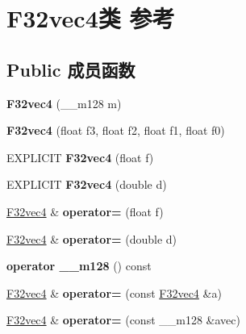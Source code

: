 \hypertarget{class_f32vec4}{}\section{F32vec4类 参考}
\label{class_f32vec4}
\subsection*{Public 成员函数}
\begin{DoxyCompactItemize}
\item 
\mbox{\label{class_f32vec4_a41c8e1640519befb7a0fc65224f541f9}} 
{\bfseries F32vec4} (\+\_\+\+\_\+m128 m)
\item 
\mbox{\label{class_f32vec4_aea420803e26904f3b1120c57877e8037}} 
{\bfseries F32vec4} (float f3, float f2, float f1, float f0)
\item 
\mbox{\label{class_f32vec4_ad18c5fd17f127656eec28b6106a0e340}} 
E\+X\+P\+L\+I\+C\+IT {\bfseries F32vec4} (float f)
\item 
\mbox{\label{class_f32vec4_a4bd213d5b8d043870dcf0263bd7b6059}} 
E\+X\+P\+L\+I\+C\+IT {\bfseries F32vec4} (double d)
\item 
\mbox{\label{class_f32vec4_abcd4d2ca5825ab697396c3948213a819}} 
\hyperlink{class_f32vec4}{F32vec4} \& {\bfseries operator=} (float f)
\item 
\mbox{\label{class_f32vec4_af866965b399a5564893f4f46277e7fec}} 
\hyperlink{class_f32vec4}{F32vec4} \& {\bfseries operator=} (double d)
\item 
\mbox{\label{class_f32vec4_ac7c07c7da71a3789c40343200b8fcc6a}} 
{\bfseries operator \+\_\+\+\_\+m128} () const
\item 
\mbox{\label{class_f32vec4_a189ac771b579ed2aeb345ae0c0efb7e3}} 
\hyperlink{class_f32vec4}{F32vec4} \& {\bfseries operator=} (const \hyperlink{class_f32vec4}{F32vec4} \&a)
\item 
\mbox{\label{class_f32vec4_aecd7a72376fa28c14e2f7c1608a71225}} 
\hyperlink{class_f32vec4}{F32vec4} \& {\bfseries operator=} (const \+\_\+\+\_\+m128 \&avec)

\end{DoxyCompactItemize}
